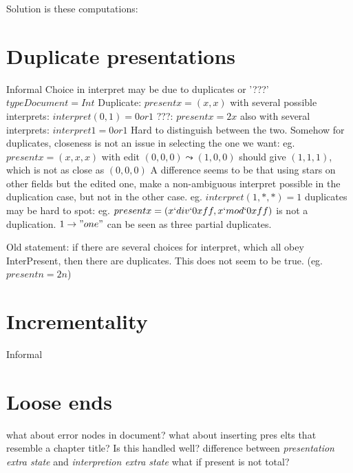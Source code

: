 Solution is these computations: 


%																
%																
%																
\section{Duplicate presentations}

Informal
\bl
\* Choice in interpret may be due to duplicates or '???'
\* $type Document = Int$ 
\* Duplicate: $present x = (x,x)$ with several possible interprets: $interpret (0,1) = 0 or 1$ 
\* ???: $present x = 2x$ also with several interprets: $interpret 1 = 0 or 1$ 
\* Hard to distinguish between the two.
\* Somehow for duplicates, closeness is not an issue in selecting the one we want:
\* eg. $present x = (x,x,x)$ with edit $(0,0,0)\leadsto(1,0,0)$ should give $(1,1,1)$, which is not as close as $(0,0,0)$
\* A difference seems to be that using stars on other fields but the edited one, make a non-ambiguous interpret possible in the duplication case, but not in the other case.
\* eg. $interpret (1,*,*) = 1$
\* duplicates may be hard to spot: eg. $present x = (x `div` 0xff, x `mod` 0xff)$ is not a duplication.
\* $1 \to "one"$ can be seen as three partial duplicates. 
\el

Old statement: if there are several choices for interpret, which all obey {\sc InterPresent}, then there are duplicates. This does not seem to be true. (eg. $present n = 2n$)

%																
%																
%																
\section{Incrementality}
Informal


%																
%																
%																
\section{Loose ends}
\bl
\* what about error nodes in document?
\* what about inserting pres elts that resemble a chapter title? Is this handled well?
\* difference between {\em presentation extra state} and {\em interpretion extra state}
\* what if present is not total?
\el


